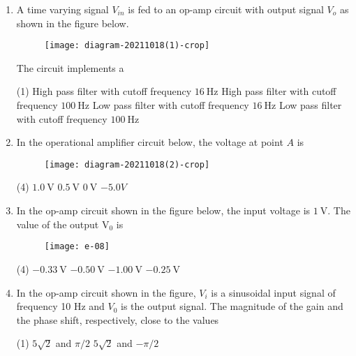 \begin{enumerate}
	\item A time varying signal $V_{i n}$ is fed to an op-amp circuit with output signal $V_{o}$ as shown in the figure below.\\
	\begin{figure}[H]
		\centering
		\texttt{[image: diagram-20211018(1)-crop]}
	\end{figure}
	The circuit implements a
	{}
\begin{tasks}(1)
\task[\textbf{A.}] High pass filter with cutoff frequency $16 \mathrm{~Hz}$
\task[\textbf{B.}] High pass filter with cutoff frequency $100 \mathrm{~Hz}$
\task[\textbf{C.}] Low pass filter with cutoff frequency $16 \mathrm{~Hz}$
\task[\textbf{D.}] Low pass filter with cutoff frequency $100 \mathrm{~Hz}$
\end{tasks}
	\item In the operational amplifier circuit below, the voltage at point $A$ is
{	}
\begin{figure}[H]
\centering
\texttt{[image: diagram-20211018(2)-crop]}
\end{figure}
\begin{tasks}(4)
\task[\textbf{A.}] $1.0 \mathrm{~V}$
\task[\textbf{B.}] $0.5 \mathrm{~V}$
\task[\textbf{C.}] $0 \mathrm{~V}$
\task[\textbf{D.}] $-5.0 V$
\end{tasks}
	\item In the op-amp circuit shown in the figure below, the input voltage is $1 \mathrm{~V}$. The value of the output $\mathrm{V}_{0}$ is
	{}
\begin{figure}[H]
\centering
\texttt{[image: e-08]}
\end{figure}
\begin{tasks}(4)
\task[\textbf{A.}] $-0.33 \mathrm{~V}$
\task[\textbf{B.}] $-0.50 \mathrm{~V}$
\task[\textbf{C.}] $-1.00 \mathrm{~V}$
\task[\textbf{D.}] $-0.25 \mathrm{~V}$
\end{tasks}
	\item In the op-amp circuit shown in the figure, $V_{i}$ is a sinusoidal input signal of frequency 10 $\mathrm{Hz}$ and $V_{0}$ is the output signal. The magnitude of the gain and the phase shift, respectively, close to the values
{	}
\begin{tasks}(1)
	\task[\textbf{A.}] $5 \sqrt{2}$ and $\pi / 2$
	\task[\textbf{B.}] $5 \sqrt{2}$ and $-\pi / 2$

\end{tasks}
\end{enumerate}

